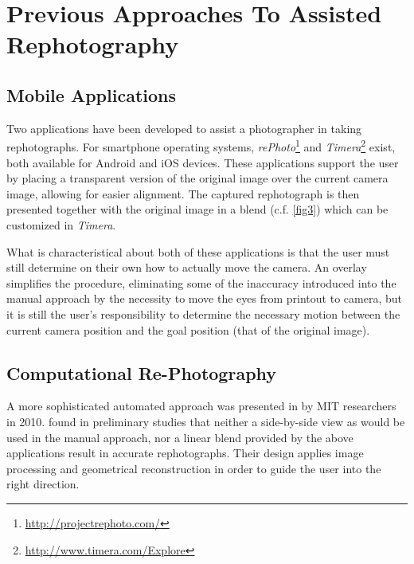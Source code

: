 \section{Previous Approaches To Assisted Rephotography}

\subsection{Mobile Applications}

Two applications have been developed to assist a photographer in taking
rephotographs. For smartphone operating systems,
\emph{rePhoto}\footnote{\url{http://projectrephoto.com/}} and
\emph{Timera}\footnote{\url{http://www.timera.com/Explore}} exist, both
available for Android and iOS devices. These applications support the user by placing a transparent
version of the original image over the current camera image, allowing for easier
alignment. The captured rephotograph is then presented together with the
original image in a blend (c.f. \autoref{fig3}) which can be customized in
\emph{Timera}.

What is characteristical about both of these applications is that the user must still
determine on their own how to actually move the camera. An overlay simplifies
the procedure, eliminating some of the inaccuracy introduced into the manual approach by the
necessity to move the eyes from printout to camera, but it is still the user's
responsibility to determine the necessary motion between the current camera
position and the goal position (that of the original image). 

\subsection{Computational Re-Photography}

A more
sophisticated automated approach was presented in by MIT researchers in
2010. \citet*{bae2010} found in preliminary studies that neither a side-by-side
view as would be used in the manual approach, nor a linear blend provided by
the above applications result in accurate rephotographs. Their design applies
image processing and geometrical reconstruction in order to guide the user into
the right direction.

